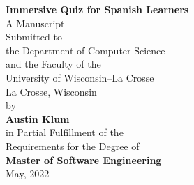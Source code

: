 \begin{titlepage}
	\begin{center}
		\vspace*{0.5in}
		\begin{doublespace}
			\LARGE \textbf{Immersive Quiz for Spanish Learners} \\
			\vspace*{1in}
			\normalsize
			A Manuscript \\
			Submitted to \\
			the Department of Computer Science \\
			and the Faculty of the\\
			University of Wisconsin--La Crosse \\
			La Crosse, Wisconsin \\
			\vspace*{0.5in}
			by \\
			\large
			\textbf{Austin Klum} \\

			\vspace*{0.5in}
			\normalsize
			in Partial Fulfillment of the \\
			Requirements for the Degree of\\
			\Large{\textbf{Master of Software Engineering}} \\
			\normalsize
			May, 2022
		\end{doublespace}
	\end{center}
\end{titlepage}

